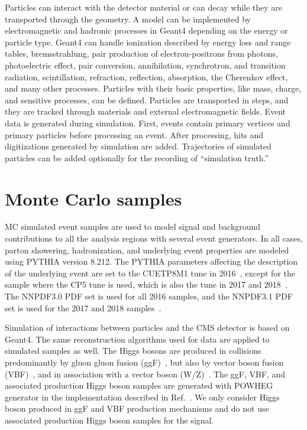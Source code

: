 Particles can interact with the detector material or can decay while they are transported through the geometry. A model can be implemented by electromagnetic and hadronic processes in Geant4 depending on the energy or particle type. Geant4 can handle ionization described by energy loss and range tables, bremsstrahlung, pair production of electron-positrons from photons, photoelectric effect, pair conversion, annihilation, synchrotron, and transition radiation, scintillation, refraction, reflection, absorption, the Cherenkov effect, and many other processes. Particles with their basic properties, like mass, charge, and sensitive processes, can be defined. Particles are transported in steps, and they are tracked through materials and external electromagnetic fields. Event data is generated during simulation. First, events contain primary vertices and primary particles before processing an event. After processing, hits and digitizations generated by simulation are added. Trajectories of simulated particles can be added optionally for the recording of ``simulation truth.''


\section{Monte Carlo samples}

MC simulated event samples are used to model signal and background contributions to all the analysis regions with several event generators. In all cases, parton showering, hadronization, and underlying event properties are modeled using PYTHIA version 8.212. The PYTHIA parameters affecting the description of the underlying event are set to the CUETP8M1 tune in 2016~\cite{Khachatryan:2015pea}, except for the \ttbar sample where the CP5 tune is used, which is also the tune in 2017 and 2018~\cite{CMS:2018zub}. The NNPDF3.0 PDF set is used for all 2016 samples, and the NNPDF3.1 PDF set is used for the 2017 and 2018 samples~\cite{Ball:2017nwa}.

Simulation of interactions between particles and the CMS detector is based on Geant4. The same reconstruction algorithms used for data are applied to simulated samples as well. The Higgs bosons are produced in \pp collisions predominantly by gluon gluon fusion (ggF)~\cite{Georgi:1977gs}, but also by vector boson fusion (VBF)~\cite{Cahn:1986zv}, and in association with a vector boson (W/Z)~\cite{Glashow:1978ab}. The ggF, VBF, and associated production Higgs boson samples are generated with POWHEG generator in the implementation described in Ref.~\cite{Heinrich:2017kxx, Buchalla:2018yce}. We only consider Higgs boson produced in ggF and VBF production mechanisms and do not use associated production Higgs boson samples for the signal.


